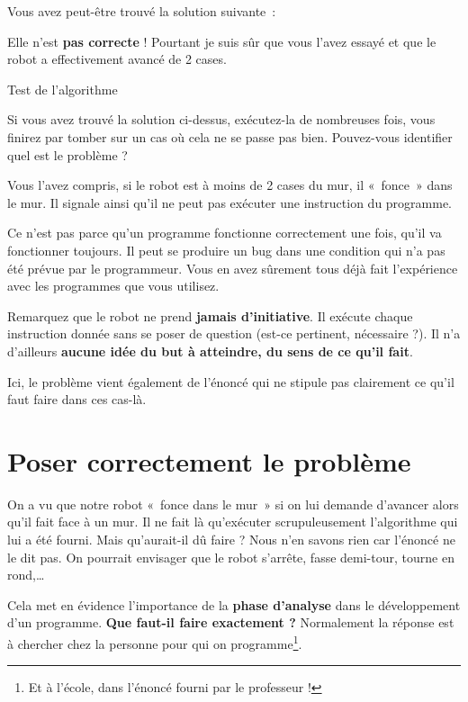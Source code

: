 	Vous avez peut-être trouvé la solution suivante~:

	
	Elle n'est \textbf{pas correcte} ! Pourtant je suis sûr
	que vous l'avez essayé et que le robot a effectivement
	avancé de 2 cases. 

	
	\begin{Emphase}[reflexion]{Test de l'algorithme}

		Si vous avez trouvé la solution ci-dessus, exécutez-la de nombreuses
		fois, vous finirez par tomber sur un cas où cela ne se passe pas bien.
		Pouvez-vous identifier quel est le problème ?

	\end{Emphase}

	Vous l'avez compris, si le robot est à moins de 2 cases
	du mur, il «~fonce~» dans le mur. Il signale ainsi
	qu'il ne peut pas exécuter une instruction du
	programme.
	
	Ce n'est pas parce qu'un programme
	fonctionne correctement une fois, qu'il va fonctionner
	toujours. Il peut se produire un bug dans une condition qui
	n'a pas été prévue par le programmeur. Vous en avez
	sûrement tous déjà fait l'expérience avec les
	programmes que vous utilisez.

	Remarquez que le robot ne prend \textbf{jamais
	d'initiative}. Il exécute chaque instruction donnée
	sans se poser de question (est-ce pertinent, nécessaire ?). Il
	n'a d'ailleurs \textbf{aucune idée du
	but à atteindre, du sens de ce qu'il fait}.
	
	Ici, le problème vient également de
	l'énoncé qui ne stipule pas clairement ce
	qu'il faut faire dans ces cas-là.

\section{Poser correctement le problème}

	On a vu que notre robot «~fonce dans le mur~» si on lui demande
	d'avancer alors qu'il fait face à un
	mur. Il ne fait là qu'exécuter scrupuleusement
	l'algorithme qui lui a été fourni. Mais
	qu'aurait-il dû faire ? Nous n'en
	savons rien car l'énoncé ne le dit pas. On pourrait
	envisager que le robot s'arrête, fasse demi-tour,
	tourne en rond,\dots
	
	Cela met en évidence l'importance de la \textbf{phase
	d'analyse} dans le développement d'un
	programme. \textbf{Que faut-il faire exactement ?} Normalement la
	réponse est à chercher chez la personne pour qui on programme\footnote{Et
	à l'école, dans l'énoncé fourni par
	le professeur ! }.
	
